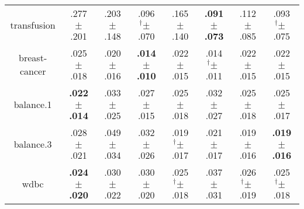 \begin{tabular}{|c|ccccccc|}
transfusion & .277$^{\phantom{\dag}}\pm^{\phantom{\dag}}$.201\cellcolor{red!40} & .203$^{\phantom{\dag}}\pm^{\phantom{\dag}}$.148\cellcolor{red!7} & .096$^{\dag}\pm^{\phantom{\dag}}$.070\cellcolor{green!38} & .165$^{\phantom{\dag}}\pm^{\phantom{\dag}}$.140\cellcolor{green!8} & \textbf{.091$^{\phantom{\dag}}\pm^{\phantom{\dag}}$.073}\cellcolor{green!40} & .112$^{\phantom{\dag}}\pm^{\phantom{\dag}}$.085\cellcolor{green!31} & .093$^{\dag}\pm^{\phantom{\dag}}$.075\cellcolor{green!39} \\
breast-cancer & .025$^{\phantom{\dag}}\pm^{\phantom{\dag}}$.018\cellcolor{red!40} & .020$^{\phantom{\dag}}\pm^{\phantom{\dag}}$.016\cellcolor{red!2} & \textbf{.014$^{\phantom{\dag}}\pm^{\phantom{\dag}}$.010}\cellcolor{green!40} & .022$^{\phantom{\dag}}\pm^{\phantom{\dag}}$.015\cellcolor{red!19} & .014$^{\dag}\pm^{\phantom{\dag}}$.011\cellcolor{green!36} & .022$^{\phantom{\dag}}\pm^{\phantom{\dag}}$.015\cellcolor{red!16} & .022$^{\phantom{\dag}}\pm^{\phantom{\dag}}$.015\cellcolor{red!14} \\
balance.1 & \textbf{.022$^{\phantom{\dag}}\pm^{\phantom{\dag}}$.014}\cellcolor{green!40} & .033$^{\phantom{\dag}}\pm^{\phantom{\dag}}$.025\cellcolor{red!40} & .027$^{\phantom{\dag}}\pm^{\phantom{\dag}}$.015\cellcolor{green!3} & .025$^{\phantom{\dag}}\pm^{\phantom{\dag}}$.018\cellcolor{green!19} & .032$^{\phantom{\dag}}\pm^{\phantom{\dag}}$.027\cellcolor{red!31} & .025$^{\phantom{\dag}}\pm^{\phantom{\dag}}$.018\cellcolor{green!19} & .025$^{\phantom{\dag}}\pm^{\phantom{\dag}}$.017\cellcolor{green!19} \\
balance.3 & .028$^{\phantom{\dag}}\pm^{\phantom{\dag}}$.021\cellcolor{green!16} & .049$^{\phantom{\dag}}\pm^{\phantom{\dag}}$.034\cellcolor{red!40} & .032$^{\phantom{\dag}}\pm^{\phantom{\dag}}$.026\cellcolor{green!6} & .019$^{\dag}\pm^{\phantom{\dag}}$.017\cellcolor{green!38} & .021$^{\phantom{\dag}}\pm^{\phantom{\dag}}$.017\cellcolor{green!33} & .019$^{\phantom{\dag}}\pm^{\phantom{\dag}}$.016\cellcolor{green!38} & \textbf{.019$^{\phantom{\dag}}\pm^{\phantom{\dag}}$.016}\cellcolor{green!40} \\
wdbc & \textbf{.024$^{\phantom{\dag}}\pm^{\phantom{\dag}}$.020}\cellcolor{green!40} & .030$^{\phantom{\dag}}\pm^{\phantom{\dag}}$.022\cellcolor{green!6} & .030$^{\phantom{\dag}}\pm^{\phantom{\dag}}$.020\cellcolor{green!4} & .025$^{\dag}\pm^{\phantom{\dag}}$.018\cellcolor{green!32} & .037$^{\phantom{\dag}}\pm^{\phantom{\dag}}$.031\cellcolor{red!40} & .026$^{\dag}\pm^{\phantom{\dag}}$.019\cellcolor{green!30} & .025$^{\dag}\pm^{\phantom{\dag}}$.018\cellcolor{green!34} \\

\end{tabular}
